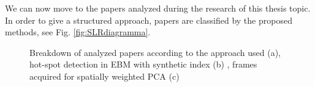 We can now move to the papers analyzed during the research of this thesis topic. In order to give a structured approach, papers are classified by the proposed methods, see Fig. \ref{fig:SLRdiagramma}.
\begin{figure}
    \centering
    \qquad
    \qquad
    \caption[Hot spots detection.]{Breakdown of analyzed papers according to the approach used (a), hot-spot detection in EBM with synthetic index (b) \cite{grasso_powder_2020}, frames acquired for spatially weighted PCA (c) \cite{colosimo_spatially_2018}}
\end{figure}

